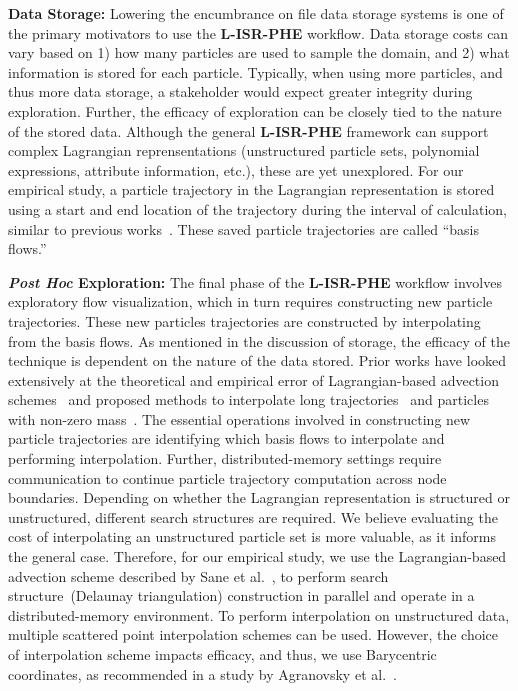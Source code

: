\textbf{Data Storage:}
%
Lowering the encumbrance on file data storage systems is one of the primary motivators to use the \textbf{L-ISR-PHE} workflow.
%
Data storage costs can vary based on 1) how many particles are used to sample the domain, and 2) what information is stored for each particle.
%
Typically, when using more particles, and thus more data storage, a stakeholder would expect greater integrity during exploration.
%
Further, the efficacy of exploration can be closely tied to the nature of the stored data.
%
Although the general \textbf{L-ISR-PHE} framework can support complex Lagrangian reprensentations (unstructured particle sets, polynomial expressions, attribute information, etc.), these are yet unexplored. 
%
For our empirical study, a particle trajectory in the Lagrangian representation is stored using a start and end location of the trajectory during the interval of calculation, similar to previous works~\cite{agranovsky2014improved, sane2018revisiting, sane2020scalable}.
%
These saved particle trajectories are called ``basis flows.''
%

\textbf{\textit{Post Hoc} Exploration:}
The final phase of the \textbf{L-ISR-PHE} workflow involves 
exploratory flow visualization, which in turn requires
constructing new particle trajectories.
%
These new particles trajectories are constructed by 
interpolating from the basis flows.
%
As mentioned in the discussion of storage, 
the efficacy of the technique is dependent on the nature of the data stored.
%
Prior works have looked extensively at the theoretical and empirical error of Lagrangian-based advection schemes~\cite{hlawatsch2011hierarchical, bujack2015lagrangian, hummel2016error, chandler2016analysis, sane2018revisiting} and proposed methods to interpolate long trajectories~\cite{sane2019interpolation} and particles with non-zero mass~\cite{chandler2015interpolation}.
%
The essential operations involved in constructing new particle trajectories 
are identifying which basis flows to interpolate and performing interpolation.
%
Further,  
distributed-memory settings require communication to continue particle trajectory computation across node boundaries. 
%
Depending on whether the Lagrangian representation is structured or unstructured, different search structures are required.
%
We believe evaluating the cost of interpolating an unstructured particle set is more valuable, as it informs the general case.
%
Therefore, for our empirical study, 
we use the Lagrangian-based advection scheme described by Sane et al.~\cite{sane2020scalable}, to perform search structure~(Delaunay triangulation) construction in parallel and operate in a distributed-memory environment.
%
To perform interpolation on unstructured data, multiple scattered point interpolation schemes can be used.
%
However, the choice of interpolation scheme impacts efficacy, and thus, we use Barycentric coordinates, as recommended in a study by Agranovsky et al.~\cite{agranovsky2015subsampling}.


